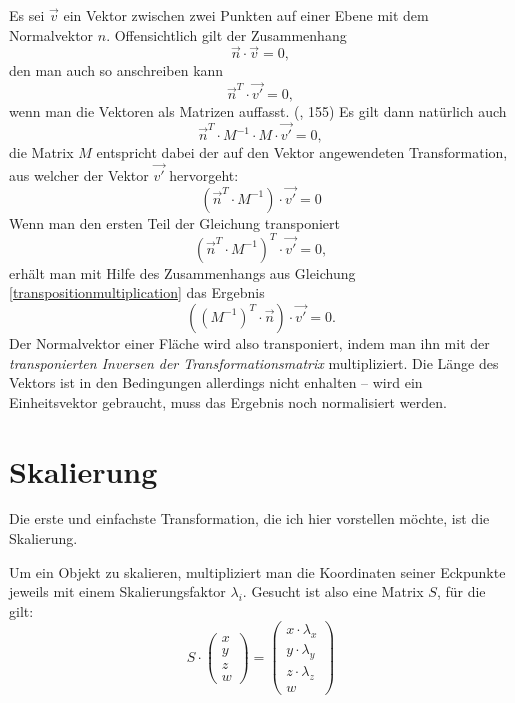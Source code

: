 Es sei $\vec v$ ein Vektor zwischen zwei Punkten auf einer Ebene mit dem Normalvektor $n$. Offensichtlich gilt der Zusammenhang
\begin{equation}
 \vec n \cdot \vec v = 0,
\end{equation}
den man auch so anschreiben kann
\begin{equation}
 \vec{n}^T \cdot \vec{v'} = 0,
\end{equation}
wenn man die Vektoren als Matrizen auffasst. (\vgl \citep{script:german}, 155) Es gilt dann natürlich auch
\begin{equation}
 \vec{n}^T \cdot M^{-1} \cdot M \cdot \vec{v'} = 0,
\end{equation}
die Matrix $M$ entspricht dabei der auf den Vektor angewendeten Transformation, aus welcher der Vektor $\vec{v'}$ hervorgeht:
\begin{equation}
 \left( \vec{n}^T \cdot M^{-1} \right) \cdot \vec{v'} = 0
\end{equation}
Wenn man den ersten Teil der Gleichung transponiert
\begin{equation}
 \left( \vec{n}^T \cdot M^{-1} \right)^T \cdot \vec{v'} = 0,
\end{equation}
erhält man mit Hilfe des Zusammenhangs aus Gleichung \ref{transpositionmultiplication} das Ergebnis
\begin{equation}
 \left( \left(M^{-1}\right)^T \cdot \vec{n} \right) \cdot \vec{v'} = 0.
\end{equation}
Der Normalvektor einer Fläche wird also transponiert, indem man ihn mit der \emph{transponierten Inversen der Transformationsmatrix} multipliziert. Die Länge des Vektors ist in den Bedingungen allerdings nicht enhalten -- wird ein Einheitsvektor gebraucht, muss das Ergebnis noch normalisiert werden.

\section{Skalierung}
\label{scaling}
Die erste und einfachste Transformation, die ich hier vorstellen möchte, ist die Skalierung.

Um ein Objekt zu skalieren, multipliziert man die Koordinaten seiner Eckpunkte jeweils mit einem Skalierungsfaktor $\lambda_i$. Gesucht ist also eine Matrix $S$, für die gilt:
\begin{equation}
 S \cdot
 \begin{pmatrix}
  x \\
  y \\
  z \\
  w
 \end{pmatrix}
 =
 \begin{pmatrix}
  x \cdot \lambda_x \\
  y \cdot \lambda_y \\
  z \cdot \lambda_z \\
  w
 \end{pmatrix}
\end{equation}

